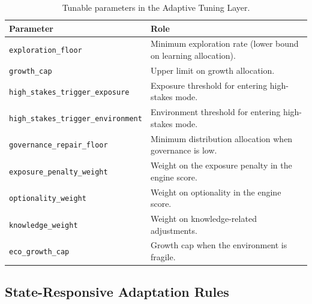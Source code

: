 \begin{table}[ht]
\centering
\small
\begin{tabularx}{\linewidth}{lX}
\toprule
\textbf{Parameter} & \textbf{Role} \\
\midrule
\texttt{exploration\_floor}
& Minimum exploration rate (lower bound on learning allocation). \\
\texttt{growth\_cap}
& Upper limit on growth allocation. \\
\texttt{high\_stakes\_trigger\_exposure}
& Exposure threshold for entering high-stakes mode. \\
\texttt{high\_stakes\_trigger\_environment}
& Environment threshold for entering high-stakes mode. \\
\texttt{governance\_repair\_floor}
& Minimum distribution allocation when governance is low. \\
\texttt{exposure\_penalty\_weight}
& Weight on the exposure penalty in the engine score. \\
\texttt{optionality\_weight}
& Weight on optionality in the engine score. \\
\texttt{knowledge\_weight}
& Weight on knowledge-related adjustments. \\
\texttt{eco\_growth\_cap}
& Growth cap when the environment is fragile. \\
\bottomrule
\end{tabularx}
\caption[Tunable parameters]{Tunable parameters in the Adaptive
Tuning Layer.}
\label{tab:vnext-tunable}
\end{table}

\subsection{State-Responsive Adaptation Rules}
\label{sec:vnext-tuning-rules}

